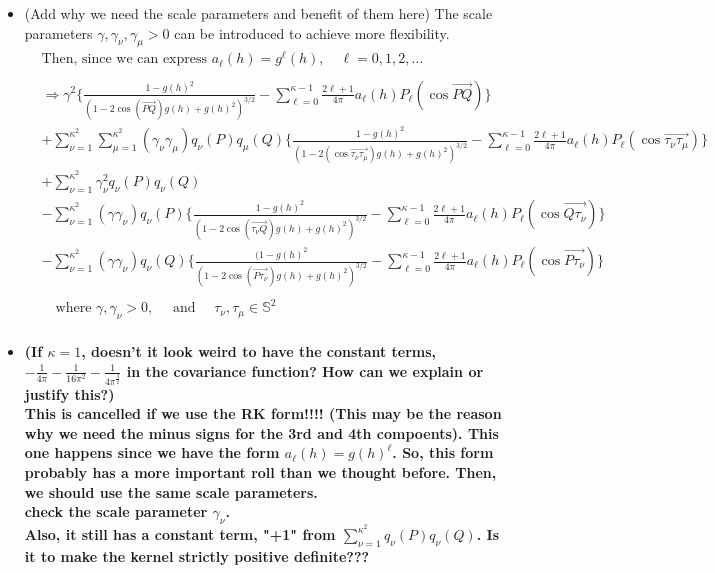 \documentclass[11pt]{article}
\begin{document}
\begin{itemize}
\item {\color{red} (Add why we need the scale parameters and benefit of them here)} The scale parameters $\gamma, \gamma_{\nu}, \gamma_{\mu} > 0$ can be introduced to achieve more flexibility.\\
\begin{align*}
&\text{Then, since we can express } a_{\ell}(h) = g^{\ell}(h), \quad \ell=0,1,2,\dots\\
\\
&\Rightarrow \gamma^2 \biggl\{ \frac{1 - g(h)^2}{(1-2 \cos{(\overrightarrow{PQ})} g(h) + g(h)^2)^{3/2}} - \sum_{\ell=0}^{\kappa-1} \frac{2\ell+1}{4\pi} a_{\ell}(h) P_{\ell}(\cos{\overrightarrow{PQ}}) \biggl\}\\
&+ \sum_{\nu=1}^{\kappa^2} \sum_{\mu=1}^{\kappa^2} (\gamma_{\nu} \gamma_{\mu}) q_{\nu}(P) q_{\mu}(Q) \biggl\{ \frac{1 - g(h)^2}{(1-2 (\cos{\overrightarrow{\tau_{\nu} \tau_{\mu}}}) g(h) + g(h)^2)^{3/2}} - \sum_{\ell=0}^{\kappa-1} \frac{2\ell+1}{4\pi} a_{\ell}(h) P_{\ell}(\cos{\overrightarrow{\tau_{\nu} \tau_{\mu}}}) \biggl\}\\ 
&+ \sum_{\nu=1}^{\kappa^2} \gamma_\nu^2 q_{\nu}(P) q_{\nu}(Q)\\
&- \sum_{\nu=1}^{\kappa^2} (\gamma \gamma_{\nu}) q_{\nu}(P) \biggl\{ \frac{1 - g(h)^2}{(1-2 \cos{(\overrightarrow{\tau_{\nu} Q})} g(h) + g(h)^2)^{3/2}} - \sum_{\ell=0}^{\kappa-1} \frac{2\ell+1}{4\pi} a_{\ell}(h)  P_{\ell}(\cos{\overrightarrow{Q\tau_{\nu}}}) \biggl\}\\
&- \sum_{\nu=1}^{\kappa^2} (\gamma \gamma_{\nu}) q_{\nu}(Q) \biggl\{\frac{(1 - g(h)^2}{(1-2 \cos{(\overrightarrow{P \tau_{\nu}})} g(h) + g(h)^2)^{3/2}} - \sum_{\ell=0}^{\kappa-1} \frac{2\ell+1}{4\pi} a_{\ell}(h)  P_{\ell}(\cos{\overrightarrow{P\tau_{\nu}}}) \biggl\}\\
\\
&\quad \text{where } \gamma, \gamma_{\nu}>0, \quad \text{ and } \quad \tau_{\nu},  \tau_{\mu} \in \mathbb{S}^2 \\
\end{align*}

\item
\textbf{{\color{red} (If $\kappa=1$, doesn't it look weird to have the constant terms, $-\frac{1}{4\pi} - \frac{1}{16\pi^2} - \frac{1}{4\pi^\frac{3}{2}}$ in the covariance function? How can we explain or justify this?)}}\\ 
\textbf{{\color{blue} This is cancelled if we use the RK form!!!! (This may be the reason why we need the minus signs for the 3rd and 4th compoents). This one happens since we have the form $a_\ell(h) = g(h)^\ell$. So, this form probably has a more important roll than we thought before. Then, we should use the same scale parameters.}}\\
\textbf{{\color{blue} check the scale parameter $\gamma_\nu$.}}\\
\textbf{{\color{blue} Also, it still has a constant term, "+1" from $\sum_{\nu=1}^{\kappa^2}q_{\nu}(P) q_{\nu}(Q)$. Is it to make the kernel strictly positive definite???}}\\


\end{itemize}
\end{document}

